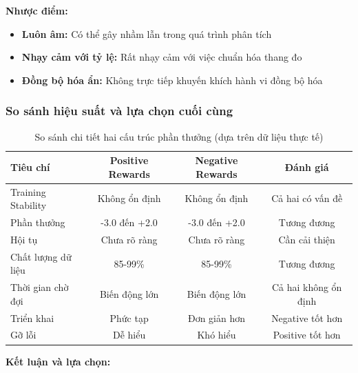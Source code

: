 \textbf{Nhược điểm:}
\begin{itemize}
    \item \textbf{Luôn âm:} Có thể gây nhầm lẫn trong quá trình phân tích

    \item \textbf{Nhạy cảm với tỷ lệ:} Rất nhạy cảm với việc chuẩn hóa thang đo

    \item \textbf{Đồng bộ hóa ẩn:} Không trực tiếp khuyến khích
        hành vi đồng bộ hóa
\end{itemize}

\subsubsection{So sánh hiệu suất và lựa chọn cuối cùng}

\begin{table}[!htp]
    \centering
    \caption{So sánh chi tiết hai cấu trúc phần thưởng (dựa trên dữ liệu thực tế)}
    \label{tab:reward_structure_comparison}
    \begin{tabular}{@{}lccc@{}}
        \toprule \textbf{Tiêu chí}  & \textbf{Positive Rewards} & \textbf{Negative Rewards} & \textbf{Đánh giá}    \\
        \midrule Training Stability & Không ổn định             & Không ổn định             & Cả hai có vấn đề     \\
        Phần thưởng                & -3.0 đến +2.0             & -3.0 đến +2.0             & Tương đương          \\
        Hội tụ                 & Chưa rõ ràng              & Chưa rõ ràng              & Cần cải thiện        \\
        Chất lượng dữ liệu                & 85-99\%                   & 85-99\%                   & Tương đương          \\
        Thời gian chờ đợi                & Biến động lớn             & Biến động lớn             & Cả hai không ổn định \\
        Triển khai              & Phức tạp                  & Đơn giản hơn              & Negative tốt hơn     \\
        Gỡ lỗi                   & Dễ hiểu                   & Khó hiểu                  & Positive tốt hơn     \\
        \bottomrule
    \end{tabular}
\end{table}

\textbf{Kết luận và lựa chọn:}

